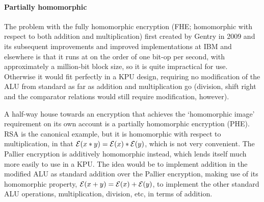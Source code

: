 \documentclass[conference]{IEEEtran}
\def\E{{\cal{E}}}
\begin{document}
\paragraph{Partially homomorphic}
The problem with the fully homomorphic encryption (FHE; homomorphic
with respect to both addition and multiplication) first created by
Gentry \cite{Gentry09, cryptoeprint:2009:616} in 2009 and its subsequent
improvements and improved implementations at IBM and elsewhere
\cite{Halevi11, Brakerski:2012} is that it runs at on the order of one
bit-op per second, with approximately a million-bit block size, so it is
quite impractical for use.  Otherwise it would fit perfectly in a KPU
design, requiring no modification of the ALU from standard as far as
addition and multiplication go (division, shift right and the
comparator relations would still require modification, however).

A half-way house towards an encryption that achieves the `homomorphic
image' requirement on its own account is a partially homomorphic
encryption (PHE).  RSA \cite{RSA} is the canonical example, but it is
homomorphic with respect to multiplication, in that
$\E(x*y)=\E(x)*\E(y)$, which is not very convenient.  The Pallier
encryption \cite{Pal} is additively homomorphic instead, which lends
itself much more easily to use in a KPU.  The idea would be to implement
addition in the modified ALU as standard addition over the Pallier
encryption, making use of its homomorphic property,
$\E(x+y)=\E(x)+\E(y)$, to implement the other standard ALU
operations, multiplication, division, etc, in terms of addition.
\end{document}
